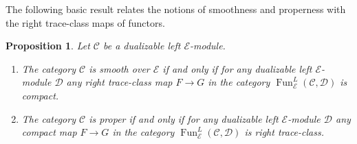 \documentclass[11pt,leqno]{amsart}
\newtheorem{prop}[theo]{Proposition}
\numberwithin{equation}{section}
\def\Hom{\operatorname{Hom}}
\newcommand{\cont}{\operatorname{cont}}
\newcommand{\cD}{{\mathcal D}}
\newcommand{\cC}{{\mathcal C}}
\newcommand{\cE}{{\mathcal E}}
\newcommand{\Fun}{\operatorname{Fun}}
\newcommand{\id}{\operatorname{id}}
\newcommand{\comp}{\operatorname{comp}}
\begin{document}
The following basic result relates the notions of smoothness and properness with the right trace-class maps of functors.

\begin{prop}\label{prop:criterions_smoothness_properness} Let $\cC$ be a dualizable left $\cE$-module. 
\begin{enumerate}[label=(\roman*), ref=(\roman*)]
\item The category $\cC$ is smooth over $\cE$ if and only if for any dualizable left $\cE$-module $\cD$ any right trace-class map $F\to G$ in the category $\Fun^L_{\cE}(\cC,\cD)$ is compact. \label{criterion_smoothness}

\item The category $\cC$ is proper if and only if for any dualizable left $\cE$-module $\cD$ any compact map $F\to G$ in the category $\Fun^L_{\cE}(\cC,\cD)$ is right trace-class. \label{criterion_properness}
\end{enumerate}
\end{prop}
\end{document}
